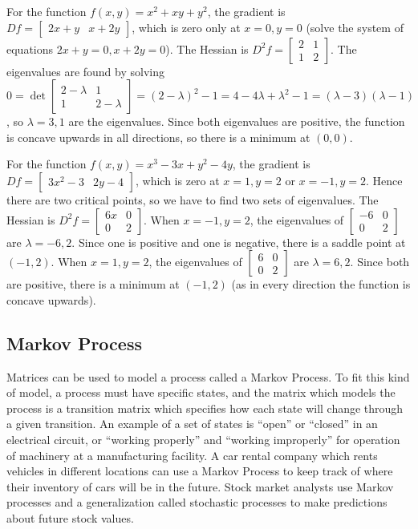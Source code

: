 \documentclass[10pt]{article}
\begin{document}
For the function {$f(x,y)=x^2+xy+y^2$}, the gradient is $Df = \begin{bmatrix}2x+y&x+2y \end{bmatrix}$, which is zero only at $x=0,y=0$ (solve the system of equations $2x+y=0,x+2y=0$). The Hessian is $D^2f = \begin{bmatrix}2&1 \\1&2\end{bmatrix}$. The eigenvalues are found by solving $0=\det \begin{bmatrix}2-\lambda &1 \\1&2-\lambda \end{bmatrix} = (2-\lambda)^2-1 = 4-4\lambda+\lambda^2 -1 = (\lambda-3)(\lambda-1)$, so $\lambda = 3,1$ are the eigenvalues.  Since both eigenvalues are positive, the function is concave upwards in all directions, so there is a minimum at $(0,0)$.  

For the function {$f(x,y)=x^3-3x+y^2-4y$}, the gradient is $Df = \begin{bmatrix}3x^2-3&2y-4 \end{bmatrix}$, which is zero at $x=1,y=2$ or $x=-1,y=2$. Hence there are two critical points, so we have to find two sets of eigenvalues. The Hessian is $D^2f = \begin{bmatrix}6x&0 \\0&2\end{bmatrix}$. When $x=-1,y=2$, the eigenvalues of $\begin{bmatrix}-6&0 \\0&2\end{bmatrix}$ are $\lambda=-6,2$. Since one is positive and one is negative, there is a saddle point at $(-1,2)$. When $x=1,y=2$, the eigenvalues of $\begin{bmatrix}6&0 \\0&2\end{bmatrix}$ are $\lambda=6,2$. Since both are positive, there is a minimum at $(-1,2)$ (as in every direction the function is concave upwards).











\subsection{Markov Process}


Matrices can be used to model a process called a Markov Process. To fit this kind of model, a process must have specific states, and the matrix which models the process is a transition matrix which specifies how each state will change through a given transition. An example of a set of states is ``open'' or ``closed'' in an electrical circuit, or ``working properly'' and ``working improperly'' for operation of machinery at a manufacturing facility. A car rental company which rents vehicles in different locations can use a Markov Process to keep track of where their inventory of cars will be in the future. Stock market analysts use Markov processes and a generalization called stochastic processes to make predictions about future stock values.
\end{document}
